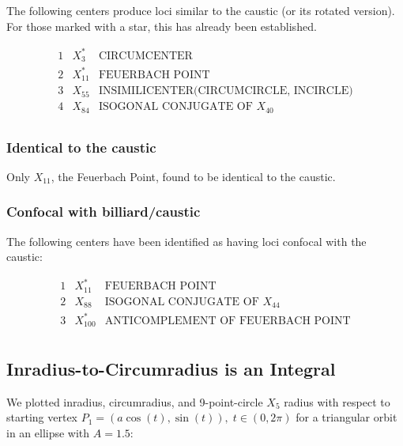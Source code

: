 \documentclass[]{article}
\begin{document}
The following centers produce loci similar to the caustic (or its rotated version). For those marked with a star, this has already been established.

\[
\begin{array}{cll}
 1 & X_{3}^* & \text{CIRCUMCENTER} \\
 2 & X_{11}^* & \text{FEUERBACH POINT} \\
 3 & X_{55} & \text{INSIMILICENTER(CIRCUMCIRCLE, INCIRCLE)} \\
 4 & X_{84} & \text{ISOGONAL CONJUGATE OF $X_{40}$} \\
\end{array}
\]

\hypertarget{identical-to-the-caustic}{%
\subsubsection{Identical to the caustic}\label{identical-to-the-caustic}}

Only \(X_{11}\), the Feuerbach Point, found to be identical to the caustic.

\hypertarget{confocal-with-billiardcaustic}{%
\subsubsection{Confocal with billiard/caustic}\label{confocal-with-billiardcaustic}}

The following centers have been identified as having loci confocal with the caustic:

\[
\begin{array}{cll}
 1 & X_{11}^* & \text{FEUERBACH POINT} \\
 2 & X_{88} & \text{ISOGONAL CONJUGATE OF $X_{44}$} \\
 3 & X_{100}^* & \text{ANTICOMPLEMENT OF FEUERBACH POINT} \\
\end{array}
\]

\hypertarget{inradius-to-circumradius-is-an-integral}{%
\subsection{Inradius-to-Circumradius is an Integral}\label{inradius-to-circumradius-is-an-integral}}

We plotted inradius, circumradius, and 9-point-circle \(X_{5}\) radius with respect to starting vertex \(P_1=(a \cos(t),\sin(t)),\;t\in(0,2\pi)\) for a triangular orbit in an ellipse with \(A=1.5\):
\end{document}
